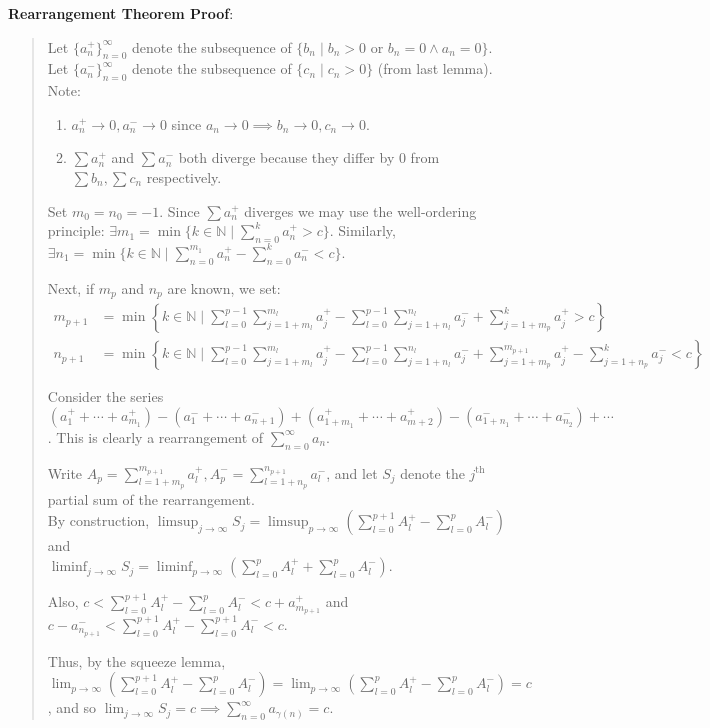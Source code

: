 \documentclass[11pt]{article}
\begin{document}
\textbf{Rearrangement Theorem Proof}:
\begin{quote}\vspace{-0.3cm}
Let $\{a_n^+\}_{n=0}^\infty$ denote the subsequence of $\{b_n \mid b_n > 0$ or $b_n = 0 \land a_n = 0\}$. Let $\{a_n^-\}_{n=0}^\infty$ denote the subsequence of $\{c_n \mid c_n > 0\}$ (from last lemma). Note:

\begin{enumerate}
\item $a_n^+ \to 0, a_n^- \to 0$ since $a_n \to 0 \implies b_n \to 0, c_n \to 0$.
\item $\sum a_n^+$ and $\sum a_n^-$ both diverge because they differ by 0 from $\sum b_n, \sum c_n$ respectively.
\end{enumerate}
Set $m_0 = n_0 = -1$. Since $\sum a_n^+$ diverges we may use the well-ordering principle: $\exists m_1 = \min\{k \in \mathbb{N} \mid \sum_{n=0}^k a_n^+ > c\}$. Similarly, $\exists n_1 = \min\{k \in \mathbb{N} \mid \sum_{n=0}^{m_1} a_n^+ - \sum_{n=0}^k a_n^- < c\}$.

Next, if $m_p$ and $n_p$ are known, we set:
\begin{align*}
m_{p+1} &= \min\left\{k \in \mathbb{N} \mid \sum_{l=0}^{p-1} \sum_{j=1+m_l}^{m_l} a_j^+ - \sum_{l=0}^{p-1} \sum_{j=1+n_l}^{n_l} a_j^- + \sum_{j=1+m_p}^k a_j^+ > c\right\}\\
n_{p+1} &= \min\left\{k \in \mathbb{N} \mid \sum_{l=0}^{p-1} \sum_{j=1+m_l}^{m_l} a_j^+ - \sum_{l=0}^{p-1} \sum_{j=1+n_l}^{n_l} a_j^- + \sum_{j=1+m_p}^{m_{p+1}} a_j^+ - \sum_{j=1+n_p}^k a_j^- < c\right\}
\end{align*}

Consider the series $(a_1^+ + \cdots + a_{m_1}^+) - (a_1^- + \cdots + a_{n+1}^-) + (a_{1+m_1}^+ + \cdots + a_{m+2}^+) - (a_{1+n_1}^- + \cdots + a_{n_2}^-) + \cdots$. This is clearly a rearrangement of $\sum_{n=0}^\infty a_n$.

Write $A_p = \sum_{l=1+m_p}^{m_{p+1}} a_l^+, A_p^- = \sum_{l=1+n_p}^{n_{p+1}} a_l^-$, and let $S_j$ denote the $j^\text{th}$ partial sum of the rearrangement.\\
By construction, $\limsup_{j \to \infty} S_j = \limsup_{p \to \infty} (\sum_{l=0}^{p+1} A_l^+ - \sum_{l=0}^p A_l^-)$ and\\
$\liminf_{j \to \infty} S_j = \liminf_{p \to \infty} (\sum_{l=0}^p A_l^+ + \sum_{l=0}^p A_l^-)$.

Also, $c < \sum_{l=0}^{p+1} A_l^+ - \sum_{l=0}^p A_l^- < c + a_{m_{p+1}}^+$ and $c - a_{n_{p+1}}^- < \sum_{l=0}^{p+1} A_l^+ - \sum_{l=0}^{p+1} A_l^- < c$.

Thus, by the squeeze lemma, $\lim_{p \to \infty} (\sum_{l=0}^{p+1} A_l^+ - \sum_{l=0}^p A_l^-) = \lim_{p \to \infty} (\sum_{l=0}^p A_l^+ - \sum_{l=0}^p A_l^-) = c$, and so $\lim_{j \to \infty} S_j = c \implies \sum_{n=0}^\infty a_{\gamma(n)} = c$.
\end{quote}
\end{document}
